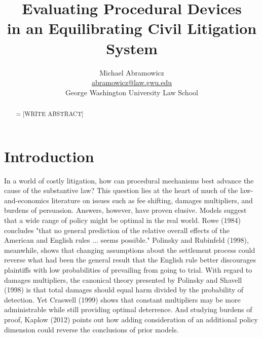 \documentclass{article}
\newenvironment{nohyphen}
  {\tolerance=1%
   \emergencystretch=\maxdimen%
   \hyphenpenalty=10000%
   \hbadness=10000}%
  {\par}%
\begin{document}
\title{Evaluating Procedural Devices \\ in an Equilibrating Civil Litigation System}
\author{Michael Abramowicz \\ \href{mailto:abramowicz@law.gwu.edu}{abramowicz@law.gwu.edu} \\ George Washington University Law School}

\maketitle

\begin{abstract}
\begin{nohyphen}
[WRITE ABSTRACT]
\end{nohyphen}
\end{abstract}

\section{Introduction}

In a world of costly litigation, how can procedural mechanisms best advance the cause of the substantive law? This question lies at the heart of much of the law-and-economics literature on issues such as fee shifting, damages multipliers, and burdens of persuasion. Answers, however, have proven elusive. Models suggest that a wide range of policy might be optimal in the real world. Rowe (1984) concludes "that no general prediction of the relative overall effects of the American and English rules ... seems possible." Polinsky and Rubinfeld (1998), meanwhile, shows that changing assumptions about the settlement process could reverse what had been the general result that the English rule better discourages plaintiffs with low probabilities of prevailing from going to trial. With regard to damages multipliers, the canonical theory presented by Polinsky and Shavell (1998) is that total damages should equal harm divided by the probability of detection. Yet Craswell  (1999) shows that constant multipliers may be more administrable while still providing optimal deterrence. And studying burdens of proof, Kaplow (2012) points out how adding consideration of an additional policy dimension could reverse the conclusions of prior models. 
\end{document}
